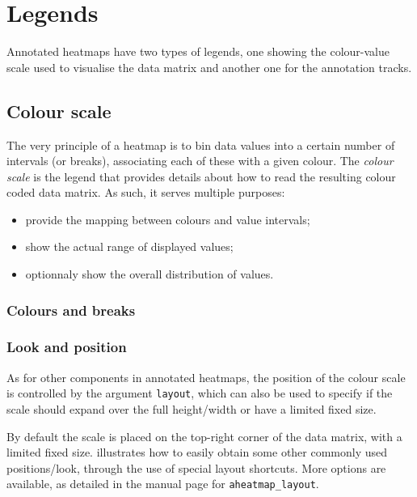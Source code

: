 \documentclass[a4paper]{article}\usepackage[]{graphicx}\usepackage[]{color}
\let\code=\texttt
\begin{document}
\section{Legends}
Annotated heatmaps have two types of legends, one showing the colour-value scale
used to visualise the data matrix and another one for the annotation tracks.

\subsection{Colour scale}
The very principle of a heatmap is to bin data values into a certain number
of intervals (or breaks), associating each of these with a given colour.
The \emph{colour scale} is the legend that provides details about how to read
the resulting colour coded data matrix.
As such, it serves multiple purposes:
\begin{itemize}
  \item provide the mapping between colours and value intervals;
  \item show the actual range of displayed values;
  \item optionnaly show the overall distribution of values.
\end{itemize}

\subsubsection{Colours and breaks}

\subsubsection{Look and position}
As for other components in annotated heatmaps, the position of the
colour scale is controlled by the argument \code{layout}, which can also be used
to specify if the scale should expand over the full height/width or have a
limited fixed size.

By default the scale is placed on the top-right corner of the data matrix, with
a limited fixed size.
 illustrates how to easily obtain some other commonly
used positions/look, through the use of special layout shortcuts.
More options are available, as detailed in the manual page for
\code{aheatmap\_layout}.
\end{document}

